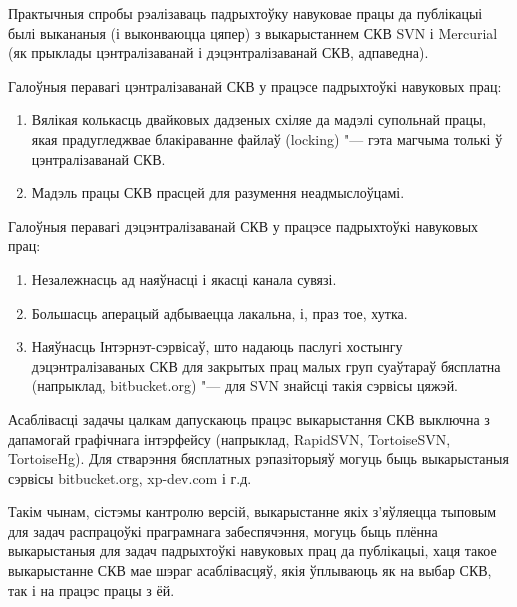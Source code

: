 \documentclass[10pt, a5paper]{article}
\begin{document}
Практычныя спробы рэалізаваць падрыхтоўку навуковае працы да публікацыі былі выкананыя (і выконваюцца цяпер) з выкарыстаннем СКВ SVN і Mercurial (як прыклады цэнтралізаванай і дэцэнтралізаванай СКВ, адпаведна).

Галоўныя перавагі цэнтралізаванай СКВ у працэсе падрыхтоўкі навуковых прац:

\begin{enumerate}
  \item Вялікая колькасць двайковых дадзеных схіляе да мадэлі супольнай працы, якая прадугледжвае блакіраванне файлаў \linebreak (locking) "--- гэта магчыма толькі ў цэнтралізаванай СКВ.
  \item Мадэль працы СКВ прасцей для разумення неадмыслоўцамі.
\end{enumerate}

Галоўныя перавагі дэцэнтралізаванай СКВ у працэсе падрыхтоўкі навуковых прац:

\begin{enumerate}
  \item Незалежнасць ад наяўнасці і якасці канала сувязі.
  \item Большасць аперацый адбываецца лакальна, і, праз тое, хутка.
  \item Наяўнасць Інтэрнэт-сэрвісаў, што надаюць паслугі хостынгу дэцэнтралізаваных СКВ для закрытых прац малых груп суаўтараў бясплатна (напрыклад, bitbucket.org) "--- для SVN знайсці такія сэрвісы цяжэй.
\end{enumerate}

Асаблівасці задачы цалкам дапускаюць працэс выкарыстання СКВ выключна з дапамогай графічнага інтэрфейсу (напрыклад, RapidSVN, TortoiseSVN, TortoiseHg). Для стварэння бясплатных рэпазіторыяў могуць быць выкарыстаныя сэрвісы bitbucket.org, xp-dev.com і г.д.

Такім чынам, сістэмы кантролю версій, выкарыстанне якіх \linebreak з'яўляецца тыповым для задач распрацоўкі праграмнага забеспячэння, могуць быць плённа выкарыстаныя для задач падрыхтоўкі навуковых прац да публікацыі, хаця такое выкарыстанне СКВ мае шэраг асаблівасцяў, якія ўплываюць як на выбар СКВ, так і на працэс працы з ёй.
\end{document}
